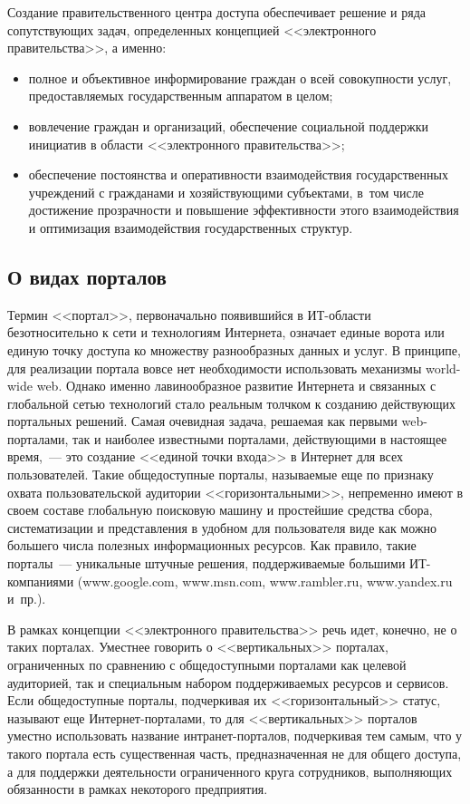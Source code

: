 \begin{multicols}{2}
Создание правительственного центра доступа обеспечивает решение и ряда
сопутствующих задач, определенных концепцией <<электронного правительства>>, а
именно:
\begin{itemize}
\item полное и объективное информирование граж\-дан о всей совокупности услуг,
предоставляемых государственным аппаратом в целом;
\item вовлечение граждан и организаций, обеспечение социальной поддержки
инициатив в об\-ласти <<электронного правительства>>;
\item обеспечение постоянства и оперативности взаимодействия государственных
учреждений с гражданами и хозяйствующими субъектами, в~том числе достижение
прозрачности и повышение эффективности этого взаимодействия и оптимизация
взаимодействия государственных структур.
\end{itemize}

\subsection{О видах порталов} %

Термин <<портал>>, первоначально появившийся в ИТ-об\-ласти безотносительно к сети и
технологиям Интернета, означает единые ворота или единую точку доступа ко множеству
разнообразных данных и услуг. В принципе, для реализации портала вовсе нет
необходимости использовать механизмы world-wide web. Однако именно лавинообразное
развитие Интернета и связанных с глобальной сетью технологий стало реальным толчком
к созданию действующих портальных решений. Самая очевидная задача, решаемая как
первыми web-пор\-та\-ла\-ми, так и наиболее известными порталами, действующими в
настоящее время,~--- это создание <<единой точки входа>> в Интернет для всех
пользователей. Такие общедоступные порталы, называемые еще по признаку охвата
пользовательской аудитории <<горизонтальными>>, непременно имеют в своем составе
глобальную поисковую машину и простейшие средства сбора, систематизации и
представления в удобном для пользователя
 виде как можно большего числа полезных
информационных ресурсов. Как правило, такие порталы~--- уникальные штучные
решения, поддерживаемые большими ИТ-ком\-па\-ния\-ми ({\sf www.google.com}, {\sf
www.msn.com}, {\sf www.rambler.ru}, {\sf www.yandex.ru} и~пр.).

В рамках концепции <<электронного правительства>> речь идет, конечно, не о таких
порталах. Уместнее говорить о <<вертикальных>> порталах, ограниченных по сравнению
с общедоступными порталами как целевой аудиторией, так и специальным набором
поддерживаемых ресурсов и сервисов. Если общедоступные порталы, подчеркивая их
<<горизонтальный>> статус, называют еще Интернет-порталами, то для
<<вертикальных>> порталов уместно использовать название интранет-порталов,
подчеркивая тем самым, что у такого портала есть существенная часть, предназначенная
не для общего доступа, а для поддержки деятельности ограниченного круга сотрудников,
выполняющих обязан\-ности в рамках некоторого предприятия.


\end{multicols}
